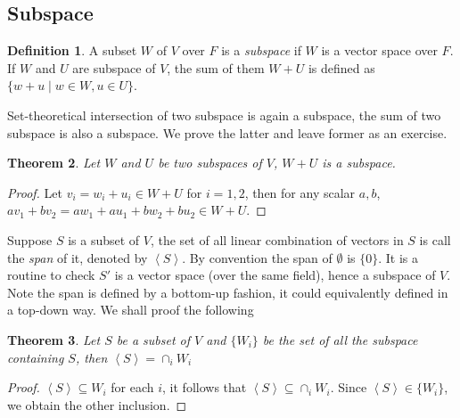 \documentclass{amsbook}
\newtheorem{theorem}{Theorem}[chapter]
\theoremstyle{definition}
\newtheorem{definition}[theorem]{Definition}
\theoremstyle{remark}
\numberwithin{section}{chapter}
\numberwithin{equation}{chapter}
\begin{document}
	\subsection{Subspace}\label{subspace}
	\begin{definition}
		A subset $W$ of $V$ over $F$ is a \emph{subspace} if $W$ is a vector space over $F$. If $W$ and $U$ are subspace of $V$, the sum of them $W+U$ is defined as $\{w + u\mid w\in W, u\in U\}$.
	\end{definition}
	Set-theoretical intersection of two subspace is again a subspace, the sum of two subspace is also a subspace. We prove the latter and leave former as an exercise.
	\begin{theorem}
		Let $W$ and $U$ be two subspaces of $V$, $W+U$ is a subspace.
	\end{theorem}
	\begin{proof}
		Let $v_i = w_i + u_i\in W+U$ for $i = 1, 2$, then for any scalar $a, b$, $av_1 + bv_2 = aw_1 + au_1 + bw_2 + bu_2\in W+U.$
	\end{proof}

	Suppose $S$ is a subset of $V$,  the set of all linear combination of vectors in $S$ is call the \emph{span} of it, denoted by $\left\langle S\right\rangle$. By convention the span of $\emptyset$ is $\{0\}$. It is a routine to check $S'$ is a vector space (over the same field), hence a subspace of $V$. 
	Note the span is defined by a bottom-up fashion, it could equivalently defined in a top-down way. We shall proof the following
	\begin{theorem}
		Let $S$ be a subset of $V$ and $\{W_i\}$ be the set of all the subspace containing $S$, then $\left\langle S\right\rangle = \cap_i W_i$
	\end{theorem}
	\begin{proof}
		$\left\langle S\right\rangle \subseteq W_i$ for each $i$, it follows that $\left\langle S\right\rangle \subseteq \cap_i W_i$. 
		Since $\left\langle S\right\rangle \in \{W_i\}$, we obtain the other inclusion.
	\end{proof}
\end{document}

